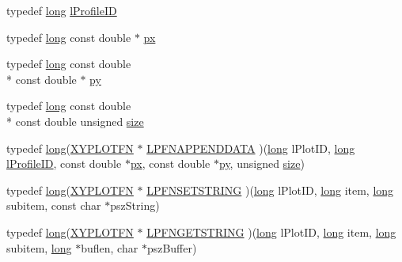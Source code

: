 \begin{DoxyCompactItemize}
\item 
typedef \hyperlink{namespacexyplot_a27bc71b0bdfac09495e7e531d8a918c5}{long} \hyperlink{namespacexyplot_a37f2e7672aa877ee74f4ab91e6a97a88}{l\-Profile\-I\-D}
\item 
typedef \hyperlink{namespacexyplot_a27bc71b0bdfac09495e7e531d8a918c5}{long} const double $\ast$ \hyperlink{namespacexyplot_aa88522a2f4371e38891cac7b5bc3e4aa}{px}
\item 
typedef \hyperlink{namespacexyplot_a27bc71b0bdfac09495e7e531d8a918c5}{long} const double \\*
const double $\ast$ \hyperlink{namespacexyplot_adc56454d6bac520db8907c6a206d3040}{py}
\item 
typedef \hyperlink{namespacexyplot_a27bc71b0bdfac09495e7e531d8a918c5}{long} const double \\*
const double unsigned \hyperlink{namespacexyplot_a0e8516aaf446c174c28a4327a27dd9ce}{size}
\item 
typedef \hyperlink{namespacexyplot_a27bc71b0bdfac09495e7e531d8a918c5}{long}(\hyperlink{_x_y_plot_wrapper_8h_aba6cc8b3b62f2540637745c385e17016}{X\-Y\-P\-L\-O\-T\-F\-N} $\ast$ \hyperlink{namespacexyplot_a159121ca25d59ecb75770f0fbeea2515}{L\-P\-F\-N\-A\-P\-P\-E\-N\-D\-D\-A\-T\-A} )(\hyperlink{namespacexyplot_a27bc71b0bdfac09495e7e531d8a918c5}{long} l\-Plot\-I\-D, \hyperlink{namespacexyplot_a27bc71b0bdfac09495e7e531d8a918c5}{long} \hyperlink{namespacexyplot_a37f2e7672aa877ee74f4ab91e6a97a88}{l\-Profile\-I\-D}, const double $\ast$\hyperlink{namespacexyplot_aa88522a2f4371e38891cac7b5bc3e4aa}{px}, const double $\ast$\hyperlink{namespacexyplot_adc56454d6bac520db8907c6a206d3040}{py}, unsigned \hyperlink{namespacexyplot_a0e8516aaf446c174c28a4327a27dd9ce}{size})
\item 
typedef \hyperlink{namespacexyplot_a27bc71b0bdfac09495e7e531d8a918c5}{long}(\hyperlink{_x_y_plot_wrapper_8h_aba6cc8b3b62f2540637745c385e17016}{X\-Y\-P\-L\-O\-T\-F\-N} $\ast$ \hyperlink{namespacexyplot_a9bb3deed6ff9723181f09eb590fdf7dd}{L\-P\-F\-N\-S\-E\-T\-S\-T\-R\-I\-N\-G} )(\hyperlink{namespacexyplot_a27bc71b0bdfac09495e7e531d8a918c5}{long} l\-Plot\-I\-D, \hyperlink{namespacexyplot_a27bc71b0bdfac09495e7e531d8a918c5}{long} item, \hyperlink{namespacexyplot_a27bc71b0bdfac09495e7e531d8a918c5}{long} subitem, const char $\ast$psz\-String)
\item 
typedef \hyperlink{namespacexyplot_a27bc71b0bdfac09495e7e531d8a918c5}{long}(\hyperlink{_x_y_plot_wrapper_8h_aba6cc8b3b62f2540637745c385e17016}{X\-Y\-P\-L\-O\-T\-F\-N} $\ast$ \hyperlink{namespacexyplot_ae11ea8cd7e895887b754555f31b0adf3}{L\-P\-F\-N\-G\-E\-T\-S\-T\-R\-I\-N\-G} )(\hyperlink{namespacexyplot_a27bc71b0bdfac09495e7e531d8a918c5}{long} l\-Plot\-I\-D, \hyperlink{namespacexyplot_a27bc71b0bdfac09495e7e531d8a918c5}{long} item, \hyperlink{namespacexyplot_a27bc71b0bdfac09495e7e531d8a918c5}{long} subitem, \hyperlink{namespacexyplot_a27bc71b0bdfac09495e7e531d8a918c5}{long} $\ast$buflen, char $\ast$psz\-Buffer)

\end{DoxyCompactItemize}
